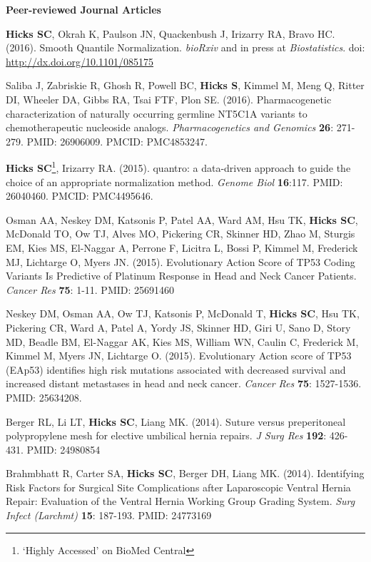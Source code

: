 \documentclass[10pt]{article}
\begin{document}
\textbf{Peer-reviewed Journal Articles}
\begin{enumerate}[label= {[\arabic*]}]
\item {\bf Hicks SC}, Okrah K, Paulson JN, Quackenbush J, Irizarry RA, Bravo HC. (2016). Smooth Quantile Normalization. {\it bioRxiv} and in press at {\it Biostatistics}. doi: \url{http://dx.doi.org/10.1101/085175} 
\item Saliba J, Zabriskie R, Ghosh R, Powell BC, {\bf Hicks S}, Kimmel M, Meng Q, Ritter DI, Wheeler DA, Gibbs RA, Tsai FTF, Plon SE. (2016). Pharmacogenetic characterization of naturally occurring germline NT5C1A variants to chemotherapeutic nucleoside analogs. {\it Pharmacogenetics and Genomics}  {\bf 26}: 271-279. PMID: 26906009. PMCID: PMC4853247. 
\item {\bf Hicks SC}\footnote{ `Highly Accessed' on BioMed Central}, Irizarry RA. (2015). quantro: a data-driven approach to guide the choice of an appropriate normalization method. {\it Genome Biol} {\bf 16}:117. PMID: 26040460. PMCID: PMC4495646. 
\item Osman AA, Neskey DM, Katsonis P, Patel AA, Ward AM, Hsu TK, {\bf Hicks SC}, McDonald TO, Ow TJ, Alves MO, Pickering CR, Skinner HD, Zhao M, Sturgis EM, Kies MS, El-Naggar A, Perrone F, Licitra L, Bossi P, Kimmel M, Frederick MJ, Lichtarge O, Myers JN. (2015). Evolutionary Action Score of TP53 Coding Variants Is Predictive of Platinum Response in Head and Neck Cancer Patients. {\it Cancer Res} {\bf 75}: 1-11. PMID: 25691460
\item Neskey DM, Osman AA, Ow TJ, Katsonis P, McDonald T, {\bf Hicks SC}, Hsu TK, Pickering CR, Ward A, Patel A, Yordy JS, Skinner HD, Giri U, Sano D, Story MD, Beadle BM, El-Naggar AK, Kies MS, William WN, Caulin C, Frederick M, Kimmel M, Myers JN, Lichtarge O. (2015). Evolutionary Action score of TP53 (EAp53) identifies high risk mutations associated with decreased survival and increased distant metastases in head and neck cancer. {\it Cancer Res} {\bf 75}: 1527-1536. PMID: 25634208.
\item Berger RL, Li LT, {\bf Hicks SC}, Liang MK. (2014). Suture versus preperitoneal polypropylene mesh for elective umbilical hernia repairs. {\it J Surg Res} {\bf 192}: 426-431. PMID: 24980854 
\item Brahmbhatt R, Carter SA, {\bf Hicks SC}, Berger DH, Liang MK. (2014). Identifying Risk Factors for Surgical Site Complications after Laparoscopic Ventral Hernia Repair: Evaluation of the Ventral Hernia Working Group Grading System. {\it Surg Infect (Larchmt)} {\bf 15}: 187-193. PMID: 24773169

\end{enumerate}
\end{document}

